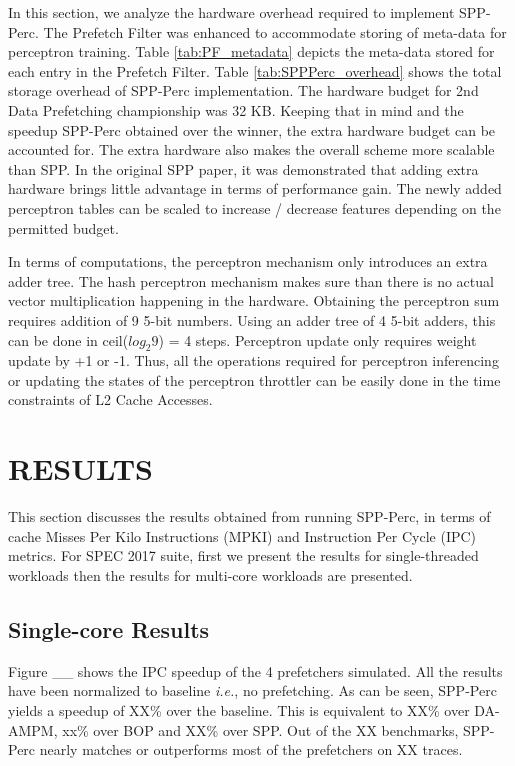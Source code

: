 \documentclass{sig-alternate}
\begin{document}

In this section, we analyze the hardware overhead required to implement SPP-Perc. 
The Prefetch Filter was enhanced to accommodate storing of meta-data for perceptron training. 
Table \ref{tab:PF_metadata} depicts the meta-data stored for each entry in the Prefetch Filter.
Table \ref{tab:SPPPerc_overhead} shows the total storage overhead of SPP-Perc implementation.
The hardware budget for 2nd Data Prefetching championship was 32 KB. 
Keeping that in mind and the speedup SPP-Perc obtained over the winner, the extra hardware budget can be accounted for.
The extra hardware also makes the overall scheme more scalable than SPP. 
In the original SPP paper, it was demonstrated that adding extra hardware brings little advantage in terms of performance gain.
The newly added perceptron tables can be scaled to increase / decrease features depending on the permitted budget.

In terms of computations, the perceptron mechanism only introduces an extra adder tree.
The hash perceptron mechanism makes sure than there is no actual vector multiplication happening in the hardware.
Obtaining the perceptron sum requires addition of 9 5-bit numbers. 
Using an adder tree of 4 5-bit adders, this can be done in ceil($log_{2}9$) = 4 steps.
Perceptron update only requires weight update by +1 or -1.
Thus, all the operations required for perceptron inferencing or updating the states of the perceptron throttler can be easily done in the time constraints of L2 Cache Accesses.


\section{RESULTS}
This section discusses the results obtained from running SPP-Perc, in terms of cache Misses Per Kilo Instructions (MPKI) and Instruction Per Cycle (IPC) metrics. 
For SPEC 2017 suite, first we present the results for single-threaded workloads then the results for multi-core workloads are presented.

\subsection{Single-core Results}
Figure \_\_ shows the IPC speedup of the 4 prefetchers simulated. 
All the results have been normalized to baseline \textit{i.e.}, no prefetching. 
As can be seen, SPP-Perc yields a speedup of XX\% over the baseline. 
This is equivalent to XX\% over DA-AMPM, xx\% over BOP and XX\% over SPP. 
Out of the XX benchmarks, SPP-Perc nearly matches or outperforms most of the prefetchers on XX traces. 
\end{document}
